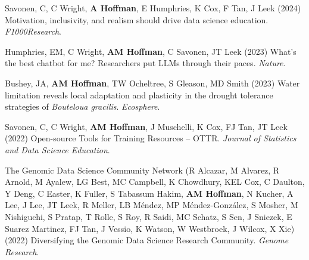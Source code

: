 \documentclass{cv}
\begin{document}
\begin{pubenum}




\item Savonen, C, C Wright, \textbf{A Hoffman}, E Humphries, K Cox, F Tan, J Leek (2024) Motivation, inclusivity, and realism should drive data science education. \textit{F1000Research}. 

\item Humphries, EM, C Wright, \textbf{AM Hoffman}, C Savonen, JT Leek (2023) What's the best chatbot for me? Researchers put LLMs through their paces. \textit{Nature}. 

\item Bushey, JA, \textbf{AM Hoffman}, TW Ocheltree, S Gleason, MD Smith (2023) Water limitation reveals local adaptation and plasticity in the drought tolerance strategies of \textit{Bouteloua gracilis}. \textit{Ecosphere}. 

\item Savonen, C, C Wright, \textbf{AM Hoffman}, J Muschelli, K Cox, FJ Tan, JT Leek (2022) Open-source Tools for Training Resources -- OTTR. \textit{Journal of Statistics and Data Science Education}. 

\item The Genomic Data Science Community Network (R Alcazar, M Alvarez, R Arnold, M Ayalew, LG Best, MC Campbell, K Chowdhury, KEL Cox, C Daulton, Y Deng, C Easter, K Fuller, S Tabassum Hakim, \textbf{AM Hoffman}\footnotemark[1], N Kucher, A Lee, J Lee, JT Leek, R Meller, LB Méndez, MP Méndez-González, S Mosher, M Nishiguchi, S Pratap, T Rolle, S Roy, R Saidi, MC Schatz, S Sen, J Sniezek, E Suarez Martinez, FJ Tan, J Vessio, K Watson, W Westbroek, J Wilcox, X Xie) (2022) Diversifying the Genomic Data Science Research Community. \textit{Genome Research}. 


\end{pubenum}
\end{document}
